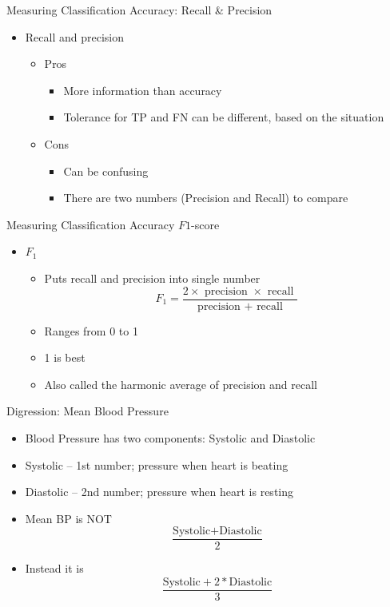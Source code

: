 \documentclass[aspectratio=169]{beamer}
\begin{document}
\begin{frame}{Measuring Classification Accuracy: Recall \& Precision}

\begin{itemize}
\item Recall and precision
	\begin{itemize}
	\item Pros
		\begin{itemize}
		\item More information than accuracy
		\item Tolerance for TP and FN can be different, based on the situation
		\end{itemize}
	\item Cons
		\begin{itemize}
		\item Can be confusing
		\item There are two numbers (Precision and Recall) to compare
		\end{itemize}
	\end{itemize}
\end{itemize}
\end{frame}
\begin{frame}{Measuring Classification Accuracy $F1$-score}

\begin{itemize}
\item $F_1$
	\begin{itemize}
	\item Puts recall and precision into single number
	$$F_1 = \frac{2 \times \textrm{ precision } \times \textrm{ recall }}{\textrm{ precision } + \textrm{ recall }}$$
	\item Ranges from 0 to 1
	\item 1 is best
	\item Also called the harmonic average of precision and recall
	\end{itemize}
\end{itemize}
\end{frame}
\begin{frame}{Digression: Mean Blood Pressure}

\begin{itemize}
\item Blood Pressure has two components: Systolic and Diastolic
\item Systolic -- 1st number; pressure when heart is beating
\item Diastolic -- 2nd number; pressure when heart is resting
\item Mean BP is NOT 
$$ \frac{\textrm{Systolic} + \textrm{Diastolic}}{2}$$
\item Instead it is 
$$ \frac{\textrm{Systolic} + 2 * \textrm{Diastolic}}{3}$$

\end{itemize}
\end{frame}
\end{document}
